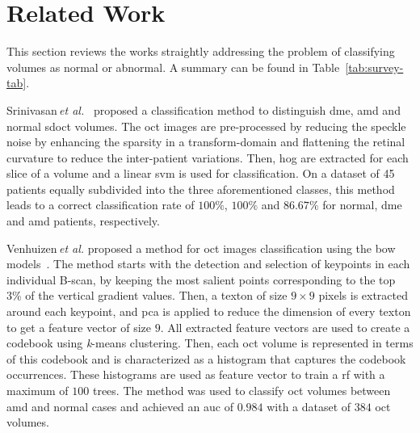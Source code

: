 
\section{Related Work}\label{sec:rw}
This section reviews the works straightly addressing the problem of classifying \oct volumes as normal or abnormal. A summary can be found in Table~\ref{tab:survey-tab}.

Srinivasan\,\textit{et al.}~\cite{Srinivasan2014} proposed a classification method to distinguish \ac{dme}, \ac{amd} and normal \ac{sdoct} volumes.
The \ac{oct} images are pre-processed by reducing the speckle noise by enhancing the sparsity in a transform-domain and flattening the retinal curvature to reduce the inter-patient variations.
Then, \ac{hog} are extracted for each slice of a volume and a linear \ac{svm} is used for classification.
On a dataset of 45 patients equally subdivided into the three aforementioned classes, this method leads to a correct classification rate of $100 \%$, $100 \%$ and $86.67 \%$ for normal, \ac{dme} and \ac{amd} patients, respectively.

Venhuizen\,\textit{et al.} proposed a method for \ac{oct} images classification using the \ac{bow} models~\cite{Venhuizen2015}.
The method starts with the detection and selection of keypoints in each individual B-scan, by keeping the most salient points corresponding to the top $3 \%$ of the vertical gradient values. Then, a texton of size $9 \times 9$ pixels is extracted around each keypoint, and \ac{pca} is applied to reduce the dimension of every texton to get a feature vector of size $9$.
All extracted feature vectors are used to create a codebook using \textit{k}-means clustering.
Then, each \ac{oct} volume is represented in terms of this codebook and is characterized as a histogram that captures the codebook occurrences.
These histograms are used as feature vector to train a \ac{rf} with a maximum of $100$ trees.
The method was used to classify \ac{oct} volumes between \ac{amd} and normal cases and achieved an \ac{auc} of $0.984$ with a dataset of $384$ \ac{oct} volumes.

